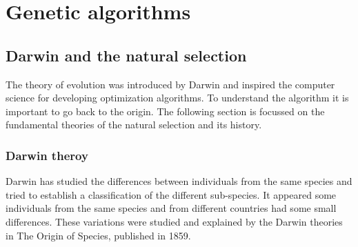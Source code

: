 \chapter{Genetic algorithms }\label{chap:EA}

\minitoc


\section{Darwin and the natural selection }

The theory of evolution was introduced by Darwin and inspired the computer science for developing optimization algorithms. To understand the algorithm it is important to go back to the origin.
The following  section is  focussed on the fundamental theories of the  natural selection and its history. 
\subsection{Darwin theroy } \label{sec:GA}

Darwin has studied the differences between individuals from the same species and tried to establish a classification of the different sub-species. It appeared some individuals from the same species and from different countries had some small differences. These variations were studied and explained by the Darwin theories in The Origin of Species, published in 1859. 

